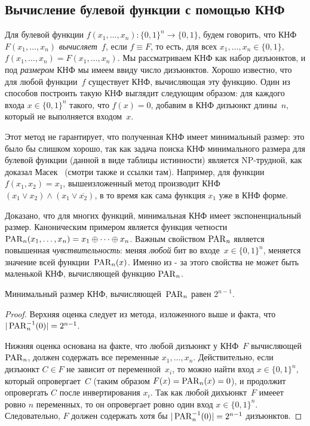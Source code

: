 \subsection{Вычисление булевой функции с помощью КНФ}
Для булевой функции $f(x_1, \dotsc, x_n) \colon \{0,1\}^n \to \{0,1\}$, будем говорить, что КНФ~$F(x_1, \dotsc, x_n)$ \emph{вычисляет~$f$}, если $f \equiv F$, то есть, для всех $x_1, \dotsc, x_n \in \{0,1\}$, $f(x_1, \dotsc, x_n)=F(x_1, \dotsc, x_n)$.
Мы рассматриваем КНФ как набор дизъюнктов, и под \emph{размером} КНФ мы имеем ввиду число дизъюнктов.
Хорошо известно, что для любой функции~$f$ существует КНФ, вычисляющая эту функцию. Один из способов построить такую КНФ выглядит следующим образом: для каждого входа $x \in \{0,1\}^n$ такого, что $f(x)=0$, добавим в КНФ дизъюнкт длины~$n$, который не выполняется входом~$x$.

Этот метод не гарантирует, что полученная КНФ имеет минимальный размер: это было бы слишком хорошо, так как задача поиска КНФ минимального размера для булевой функции (данной в виде таблицы истинности) является NP-трудной, как доказал Масек~\cite{MasekNpComp} (смотри также \cite{DBLP:journals/siamcomp/AllenderHMPS08} и ссылки там).
Например, для функции $f(x_1,x_2)=x_1$, вышеизложенный метод производит КНФ $({x_1} \lor x_2) \land ({x_1} \lor \overline{x_2})$, в то время как сама функция $x_1$ уже в КНФ форме.

Доказано, что для многих функций, минимальная КНФ имеет экспоненциальный размер. Каноническим примером является функция четности $\operatorname{PAR}_n(x_1, \dotsc, x_n)=x_1 \oplus \dotsb \oplus x_n$. Важным свойством $\operatorname{PAR}_n$ является повышенная \emph{чувствительность}: меняя \emph{любой} бит во входе~$x \in \{0,1\}^n$, меняется значение всей функции~$\operatorname{PAR}_n(x)$. Именно из - за этого свойства не может быть маленькой КНФ, вычисляющей функцию $\operatorname{PAR}_n$.

\begin{lemma}\label{lemma:detparity}
	Минимальный размер КНФ, вычисляющей~$\operatorname{PAR}_n$ равен $2^{n-1}$.
\end{lemma}
\begin{proof}
	Верхняя оценка следует из метода, изложенного выше и факта, что $|\operatorname{PAR}_n^{-1}(0)|=2^{n-1}$.
	
	Нижняя оценка основана на факте, что любой дизъюнкт у КНФ~$F$ вычисляющей $\operatorname{PAR}_n$, должен содержать все переменные $x_1, \dotsc, x_n$.
	Действительно, если дизъюнкт $C \in F$ не зависит от переменной~$x_i$, то можно найти вход $x \in \{0,1\}^n$, который опровергает~$C$ (таким образом $F(x)=\operatorname{PAR}_n(x)=0$), и продолжит опровергать $C$ после инвертирования $x_i$. 
	Так как любой дихъюнкт~$F$ имееет ровно $n$ переменных, то он опровергает ровно один вход $x \in \{0,1\}^n$. Следовательно, $F$ должен содержать хотя бы  $|\operatorname{PAR}_n^{-1}(0)|=2^{n-1}$ дизъюнктов.
\end{proof}

